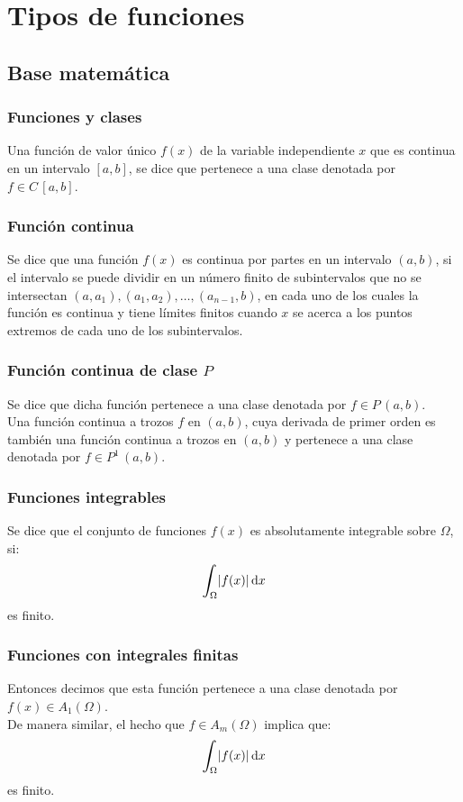 \documentclass[12pt]{beamer}
\begin{document}
\section{Tipos de funciones}
\subsection{Base matemática}

\begin{frame}
\frametitle{Funciones y clases}
Una función de valor único $f (x)$ de la variable independiente $x$ que es continua en un intervalo $[a, b]$, se dice que pertenece a una clase denotada por $f \in C \, [a, b]$.
\end{frame}
\begin{frame}
\frametitle{Función continua}
Se dice que una función $f (x)$ es continua por partes en un intervalo $(a, b)$, \pause si el intervalo se puede dividir en un número finito de subintervalos que no se intersectan $(a, a_{1}), (a_{1}, a_{2}), \ldots, (a_{n -1}, b)$, \pause en cada uno de los cuales la función es continua y tiene límites finitos cuando $x$ se acerca a los puntos extremos de cada uno de los subintervalos.
\end{frame}
\begin{frame}
\frametitle{Función continua de clase $P$}
Se dice que dicha función pertenece a una clase denotada por $f \in P \, (a, b)$.
\\
\bigskip
\pause
Una función continua a trozos $f$ en $(a, b)$, cuya derivada de primer orden es también una función continua a trozos en $(a, b)$ y pertenece a una clase denotada por $f \in P^{1} \, (a, b)$.
\end{frame}
\begin{frame}
\frametitle{Funciones integrables}
Se dice que el conjunto de funciones $f (x)$ es absolutamente integrable sobre $\Omega$, si:
\pause
\begin{align*}
\scaleint{6ex}_{\bs \Omega}  \abs{f (x)} \dd{x}
\end{align*}
es finito.
\end{frame}
\begin{frame}
\frametitle{Funciones con integrales finitas}
Entonces decimos que esta función pertenece a una clase denotada por $f (x) \in A_{1} (\Omega)$.
\\
\bigskip
\pause
De manera similar, el hecho que $f \in A_{m} (\Omega)$ implica que:
\begin{align*}
\scaleint{6ex}_{\bs \Omega}  \abs{f (x)} \dd{x}
\end{align*}
es finito.
\end{frame}
\end{document}
